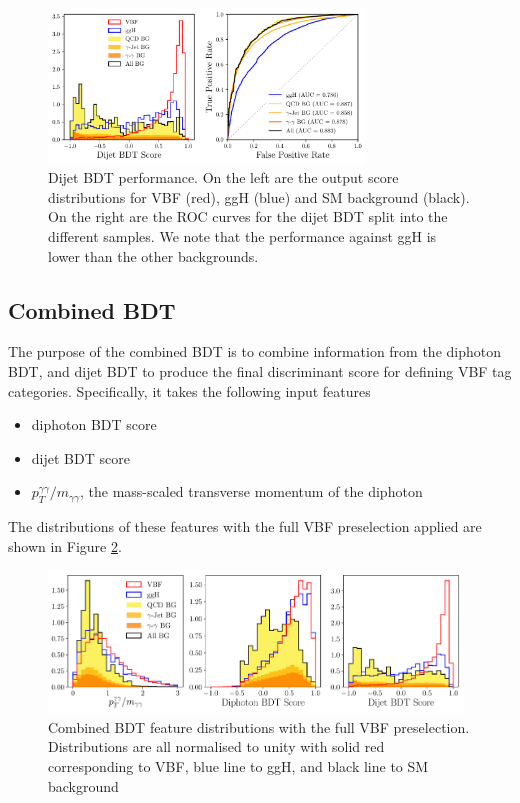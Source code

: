\begin{figure}[h!]
        \includegraphics[width=0.75\textwidth]{figures/event_selection/dijet_BDT_PS.pdf}
    \caption{Dijet BDT performance. On the left are the output score distributions for VBF (red), ggH (blue) and SM background (black). On the right are the ROC curves for the dijet BDT split into the different samples. We note that the performance against ggH is lower than the other backgrounds.}
    \label{fig:event_categorisaton:dijet_bdt_performance}
\end{figure}









\subsection{Combined BDT}
The purpose of the combined BDT is to combine information from the diphoton BDT, and dijet BDT to produce the final discriminant score for defining VBF tag categories. 
Specifically, it takes the following input features
\begin{itemize}[leftmargin=.5in,noitemsep]
    \item diphoton BDT score
    \item dijet BDT score
    \item $p_{T}^{\gamma\gamma}/m_{\gamma\gamma}$, the mass-scaled transverse momentum of the diphoton
\end{itemize}
The distributions of these features with the full VBF preselection applied are shown in Figure \ref{fig:event_categorisaton:combined_bdt_features}.
\begin{figure}[h!]
    \includegraphics[width=0.98\textwidth]{figures/event_selection/combined_BDT_features_splitBG_PS.pdf}
    \caption{Combined BDT feature distributions with the full VBF preselection. Distributions are all normalised to unity with solid red corresponding to VBF, blue line to ggH, and black line to SM background}
    \label{fig:event_categorisaton:combined_bdt_features}
\end{figure}

